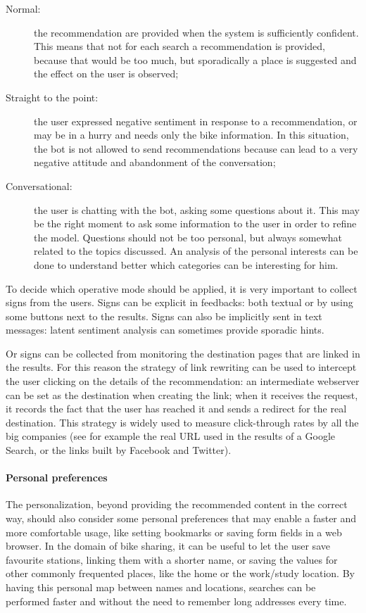 \begin{description}
	\item[Normal:] the recommendation are provided when the system is sufficiently confident. This means that not for each search a recommendation is provided, because that would be too much, but sporadically a place is suggested and the effect on the user is observed;
	\item[Straight to the point:] the user expressed negative sentiment in response to a recommendation, or may be in a hurry and needs only the bike information. In this situation, the bot is not allowed to send recommendations because can lead to a very negative attitude and abandonment of the conversation;
	\item[Conversational:] the user is chatting with the bot, asking some questions about it. This may be the right moment to ask some information to the user in order to refine the model. Questions should not be too personal, but always somewhat related to the topics discussed. An analysis of the personal interests can be done to understand better which categories can be interesting for him.
\end{description}
To decide which operative mode should be applied, it is very important to collect signs from the users. Signs can be explicit in feedbacks: both textual or by using some buttons next to the results. Signs can also be implicitly sent in text messages: latent sentiment analysis can sometimes provide sporadic hints.

Or signs can be collected from monitoring the destination pages that are linked in the results. For this reason the strategy of link rewriting can be used to intercept the user clicking on the details of the recommendation: an intermediate webserver can be set as the destination when creating the link; when it receives the request, it records the fact that the user has reached it and sends a redirect for the real destination. This strategy is widely used to measure click-through rates by all the big companies (see for example the real URL used in the results of a Google Search, or the links built by Facebook and Twitter).

\paragraph{Personal preferences}
The personalization, beyond providing the recommended content in the correct way, should also consider some personal preferences that may enable a faster and more comfortable usage, like setting bookmarks or saving form fields in a web browser. In the domain of bike sharing, it can be useful to let the user save favourite stations, linking them with a shorter name, or saving the values for other commonly frequented places, like the home or the work/study location. By having this personal map between names and locations, searches can be performed faster and without the need to remember long addresses every time.

